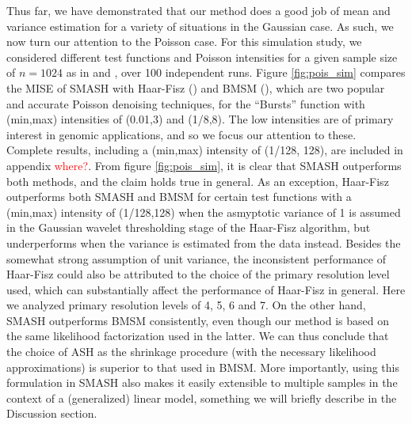 \documentclass[12pt]{article}
\begin{document}
Thus far, we have demonstrated that our method does a good job of mean and variance estimation for a variety of situations in the Gaussian case. As such, we now turn our attention to the Poisson case. For this simulation study, we considered different test functions and Poisson intensities for a given sample size of $n=1024$ as in \cite{Timmermann1999Multiscale} and \cite{Fryzlewicz2004HaarFisz}, over 100 independent runs. Figure \ref{fig:pois_sim} compares the MISE of SMASH with Haar-Fisz (\cite{Fryzlewicz2004HaarFisz}) and BMSM (\cite{Kolaczyk1999Bayesian}), which are two popular and accurate Poisson denoising techniques, for the ``Bursts'' function with (min,max) intensities of (0.01,3) and (1/8,8). The low intensities are of primary interest in genomic applications, and so we focus our attention to these. Complete results, including a (min,max) intensity of (1/128, 128), are included in appendix \textcolor{red}{where?}. From figure \ref{fig:pois_sim}, it is clear that SMASH outperforms both methods, and the claim holds true in general. As an exception, Haar-Fisz outperforms both SMASH and BMSM for certain test functions with a (min,max) intensity of (1/128,128) when the asmyptotic variance of 1 is assumed in the Gaussian wavelet thresholding stage of the Haar-Fisz algorithm, but underperforms when the variance is estimated from the data instead. Besides the somewhat strong assumption of unit variance, the inconsistent performance of Haar-Fisz could also be attributed to the choice of the primary resolution level used, which can substantially affect the performance of Haar-Fisz in general. Here we analyzed primary resolution levels of 4, 5, 6 and 7. On the other hand, SMASH outperforms BMSM consistently, even though our method is based on the same likelihood factorization used in the latter. We can thus conclude that the choice of ASH as the shrinkage procedure (with the necessary likelihood approximations) is superior to that used in BMSM. More importantly, using this formulation in SMASH also makes it easily extensible to multiple samples in the context of a (generalized) linear model, something we will briefly describe in the Discussion section.
\end{document}
